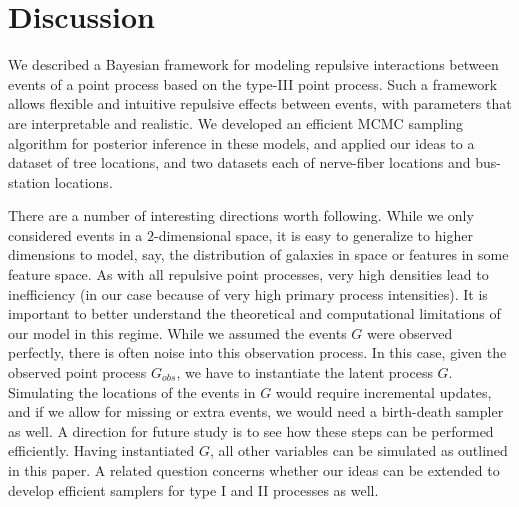 \documentclass{statsoc}
\begin{document}
\section{Discussion}
We described a Bayesian framework for modeling repulsive interactions between events of a point process based on the \matern type-III point process. Such a framework allows flexible and intuitive repulsive effects between events, with parameters that are interpretable and realistic.
We developed an efficient MCMC sampling algorithm for posterior inference in these models,
and applied our ideas to a dataset of tree locations, and two datasets each of nerve-fiber locations and bus-station locations.


There are a number of interesting directions worth following.
While we only considered events in a $2$-dimensional space,
it is easy to generalize to higher dimensions to model, say, the distribution of galaxies in space or features in some 
feature space.
As with all repulsive point processes, very high densities lead to inefficiency (in our case because of very high primary process intensities).
It is important to better understand the theoretical and computational limitations of our model in this regime.
While we assumed the \matern events $G$ were observed perfectly, there is often noise into this observation process. In this case, given
the observed point process $G_{obs}$, we have to instantiate the latent \matern process $G$. 
Simulating the locations of the events in $G$ would require incremental updates, and if we allow for missing or extra events, we would need a 
birth-death sampler as well. A direction for future study is to see how these steps can be performed efficiently.
Having instantiated $G$, all other variables can be simulated as outlined in this paper. 
A related question concerns whether our ideas can be extended to develop efficient samplers for \matern type I and II processes as well.
\end{document}
